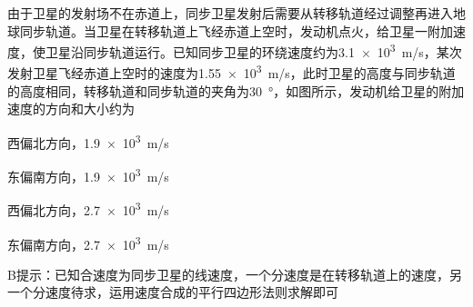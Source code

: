 由于卫星的发射场不在赤道上，同步卫星发射后需要从转移轨道经过调整再进入地球同步轨道。当卫星在转移轨道上飞经赤道上空时，发动机点火，给卫星一附加速度，使卫星沿同步轨道运行。已知同步卫星的环绕速度约为\qty{3.1e3}{m/s}，某次发射卫星飞经赤道上空时的速度为\qty{1.55e3}{m/s}，此时卫星的高度与同步轨道的高度相同，转移轨道和同步轨道的夹角为\qty{30}{\degree}，如图所示，发动机给卫星的附加速度的方向和大小约为\paren[]

\begin{choices}
	\item 西偏北方向，\qty{1.9e3}{m/s}
	\item 东偏南方向，\qty{1.9e3}{m/s}
	\item 西偏北方向，\qty{2.7e3}{m/s}
	\item 东偏南方向，\qty{2.7e3}{m/s}
\end{choices}
\begin{answer}
	B\qquad 提示：已知合速度为同步卫星的线速度，一个分速度是在转移轨道上的速度，另一个分速度待求，运用速度合成的平行四边形法则求解即可
\end{answer}